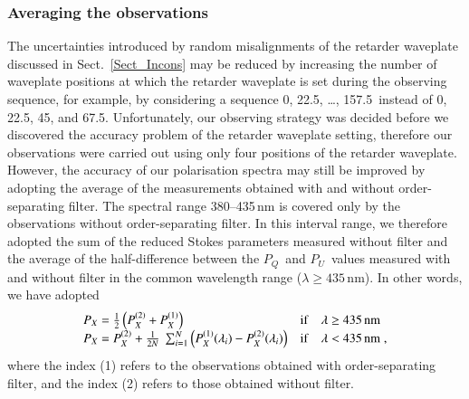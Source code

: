 \documentclass[a4paper]{aa}
\newcommand{\pq}{\ensuremath{P_Q}}
\newcommand{\pu}{\ensuremath{P_U}}
\newcommand{\px}{\ensuremath{P_{X}}}
\begin{document}
\subsubsection{Averaging the observations}\label{Sect_Aver}
The uncertainties introduced by random misalignments of the retarder
waveplate discussed in Sect.~\ref{Sect_Incons} may be reduced by
increasing the number of waveplate positions at which the retarder
  waveplate is set during the observing sequence, for example, by considering a
  sequence 0\degr, 22.5\degr, \ldots, 157.5\degr\ instead of
  0\degr, 22.5\degr, 45\degr, and 67.5\degr. Unfortunately, 
our observing strategy was decided before we discovered the accuracy
problem of the retarder waveplate setting, therefore our observations
were carried out using only four positions of the retarder waveplate.
However, the accuracy of our polarisation spectra may still be improved by 
adopting the average of the measurements obtained with and without order-separating filter. The spectral range 380--435\,nm is covered only by
the observations without order-separating filter. In this interval
range, we therefore adopted the sum of the reduced Stokes parameters measured
without filter and the average of the half-difference between the
\pq\ and \pu\ values measured with and without filter in the common
wavelength range ($\lambda \ge 435$\,nm).  In other words, we have adopted
\begin{equation}
\begin{array}{lcl}
    \px = \frac{1}{2}\left(\px^{\rm (2)} + \px^{\rm (1)}\right)    &{\rm if}& \lambda \ge 435\,{\rm nm}\\
    \px = \px^{\rm (2)} +
    \frac{1}{2N}\ \sum_{i=1}^{N}
    \left(\px^{\rm (1)}(\lambda_i)-\px^{\rm (2)}(\lambda_i)\right) &{\rm if}& \lambda < 435\,{\rm nm} \; , \\
\end{array}
\label{Eq_Average}
\end{equation}
where the index (1) refers to the observations obtained with order-separating
filter, and the index (2) refers to those obtained without filter.
\end{document}
